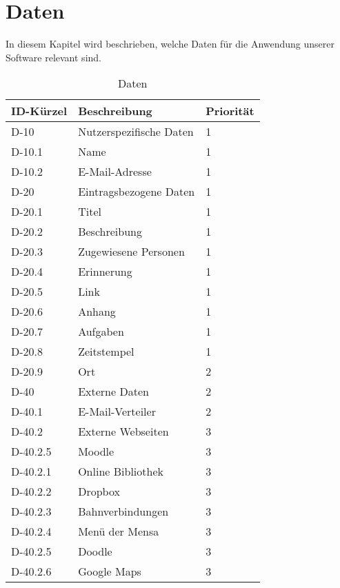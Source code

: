 
\chapter{Daten}

In diesem Kapitel wird beschrieben, welche Daten für die Anwendung unserer Software relevant sind.\\
\begin{longtable}{|l|p{5cm}|l|}
    \toprule
    \textbf{ID-Kürzel} & \textbf{Beschreibung} & \textbf{Priorität}\\
    \hline
    \endhead
    \hline
    \caption{Daten}
    \endfoot

    D-10 & Nutzerspezifische Daten & 1\\
    D-10.1 & Name &1\\
    D-10.2 & E-Mail-Adresse &1 \\       
    \hline
    D-20 & Eintragsbezogene Daten & 1\\
    D-20.1 & Titel &1\\
    D-20.2 & Beschreibung & 1\\
    D-20.3 & Zugewiesene Personen & 1\\
    D-20.4 & Erinnerung &1\\
    D-20.5 & Link &1\\
    D-20.6 & Anhang &1\\
    D-20.7 & Aufgaben & 1\\
    D-20.8 & Zeitstempel & 1 \\
    D-20.9 & Ort &  2\\
    
    \hline
    D-40 & Externe Daten & 2\\
    D-40.1 & E-Mail-Verteiler & 2\\
    D-40.2 & Externe Webseiten & 3 \\
    D-40.2.5 & Moodle & 3\\        
    D-40.2.1 & Online Bibliothek & 3\\
    D-40.2.2 & Dropbox & 3 \\
    D-40.2.3 & Bahnverbindungen & 3\\
    D-40.2.4 & Menü der Mensa & 3\\
    D-40.2.5 & Doodle & 3\\  
    D-40.2.6 & Google Maps & 3 \\      
    \hline
\end{longtable}


